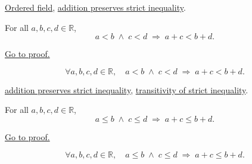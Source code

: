 \begin{dependencies}
\hyperref[def:real-ordered-field]{Ordered field},
\hyperref[thm:ineq-add-both-sides]{addition preserves strict inequality}.
\end{dependencies}


\begin{theorem}
\label{thm:ineq-add-inequalities}
For all $a, b, c, d \in \mathbb{R}$,
\[
  a < b \;\land\; c < d \;\Rightarrow\; a + c < b + d.
\]
\end{theorem}



\begin{remark*}[Proof]
\hyperref[prf:ineq-add-inequalities]{Go to proof.}
\end{remark*}

\begin{remark*}
\[
  \forall a, b, c, d \in \mathbb{R},\quad
  a < b \;\land\; c < d \;\Rightarrow\; a + c < b + d.
\]
\end{remark*}

\begin{dependencies}
\hyperref[thm:ineq-add-both-sides]{addition preserves strict inequality},
\hyperref[thm:ineq-transitivity-strict]{transitivity of strict inequality}.
\end{dependencies}


\begin{theorem}
\label{thm:ineq-nonstrict-add-inequalities}
For all $a, b, c, d \in \mathbb{R}$,
\[
  a \le b \;\land\; c \le d \;\Rightarrow\; a + c \le b + d.
\]
\end{theorem}



\begin{remark*}[Proof]
\hyperref[prf:ineq-nonstrict-add-inequalities]{Go to proof.}
\end{remark*}

\begin{remark*}
\[
  \forall a, b, c, d \in \mathbb{R},\quad
  a \le b \;\land\; c \le d \;\Rightarrow\; a + c \le b + d.
\]
\end{remark*}

